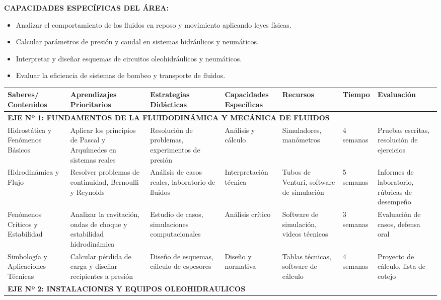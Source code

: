 \documentclass[11pt, a4paper]{article}
\begin{document}
\vspace{1em}
\noindent \textbf{CAPACIDADES ESPECÍFICAS DEL ÁREA:}
\begin{itemize}
\item Analizar el comportamiento de los fluidos en reposo y movimiento aplicando leyes físicas.
\item Calcular parámetros de presión y caudal en sistemas hidráulicos y neumáticos.
\item Interpretar y diseñar esquemas de circuitos oleohidráulicos y neumáticos.
\item Evaluar la eficiencia de sistemas de bombeo y transporte de fluidos.
\end{itemize}

\vspace{1em}
\begin{longtable}{|p{2.5cm}|p{3cm}|p{4cm}|p{3cm}|p{2.5cm}|p{1.5cm}|p{3cm}|}
\hline
\rowcolor{gray!20} \textbf{Saberes/ Contenidos} & \textbf{Aprendizajes Prioritarios} & \textbf{Estrategias Didácticas} & \textbf{Capacidades Específicas} & \textbf{Recursos} & \textbf{Tiempo} & \textbf{Evaluación} \\
\hline
\multicolumn{7}{|l|}{\textbf{EJE Nº 1: FUNDAMENTOS DE LA FLUIDODINÁMICA Y MECÁNICA DE FLUIDOS}} \\
\hline
Hidrostática y Fenómenos Básicos & Aplicar los principios de Pascal y Arquímedes en sistemas reales & Resolución de problemas, experimentos de presión & Análisis y cálculo & Simuladores, manómetros & 4 semanas & Pruebas escritas, resolución de ejercicios \\
\hline
Hidrodinámica y Flujo & Resolver problemas de continuidad, Bernoulli y Reynolds & Análisis de casos reales, laboratorio de fluidos & Interpretación técnica & Tubos de Venturi, software de simulación & 5 semanas & Informes de laboratorio, rúbricas de desempeño \\
\hline
Fenómenos Críticos y Estabilidad & Analizar la cavitación, ondas de choque y estabilidad hidrodinámica & Estudio de casos, simulaciones computacionales & Análisis crítico & Software de simulación, videos técnicos & 3 semanas & Evaluación de casos, defensa oral \\
\hline
Simbología y Aplicaciones Técnicas & Calcular pérdida de carga y diseñar recipientes a presión & Diseño de esquemas, cálculo de espesores & Diseño y normativa & Tablas técnicas, software de cálculo & 4 semanas & Proyecto de cálculo, lista de cotejo \\
\hline
\multicolumn{7}{|l|}{\textbf{EJE Nº 2: INSTALACIONES Y EQUIPOS OLEOHIDRAULICOS}} \\

\end{longtable}
\end{document}
